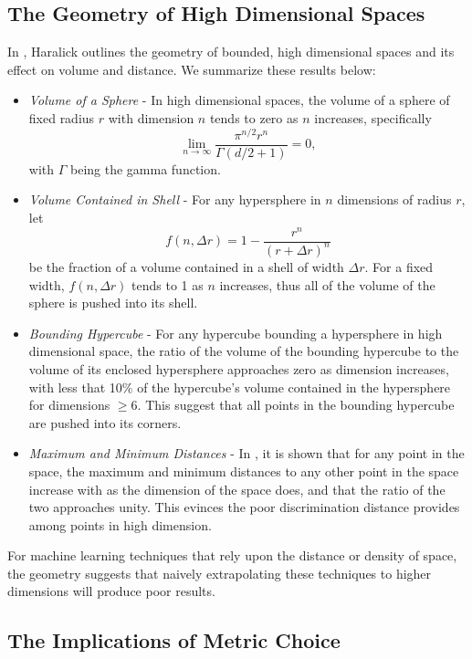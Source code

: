 \documentclass{article}
\begin{document}
\subsection{The Geometry of High Dimensional Spaces}
In \cite{haralickgeometryhd}, Haralick outlines the geometry of bounded, high dimensional spaces and its effect on volume and distance. We summarize these results below:
\begin{itemize} 
\item\emph{Volume of a Sphere} - In high dimensional spaces, the volume of a sphere of fixed radius $r$ with dimension $n$ tends to zero as $n$ increases, specifically
$$
\lim_{n\rightarrow\infty}\dfrac{\pi^{n/2}r^n}{\Gamma(d/2+1)}=0,
$$
with $\Gamma$ being the gamma function.
\item \emph{Volume Contained in Shell} - For any hypersphere in $n$ dimensions of radius $r$, let
$$
f(n,\Delta r)=1 -\dfrac{r^n}{(r+\Delta r)^n}
$$
be the fraction of a volume contained in a shell of width $\Delta r$. For a fixed width, $f(n,\Delta r)$ tends to 1 as $n$ increases, thus all of the volume of the sphere is pushed into its shell.
\item\emph{Bounding Hypercube} - For any hypercube bounding a hypersphere in high dimensional space, the ratio of the volume of the bounding hypercube to the volume of its enclosed hypersphere approaches zero as dimension increases, with less that 10\% of the hypercube's volume contained in the hypersphere for dimensions $\geq 6$. This suggest that all points in the bounding hypercube are pushed into its corners. 
\item\emph{Maximum and Minimum Distances} - In \cite{haralicknn}, it is shown that for any point in the space, the maximum and minimum distances to any other point in the space increase with as the dimension of the space does, and that the ratio of the two approaches unity.  This evinces the poor discrimination distance provides among points in high dimension.
\end{itemize}
For machine learning techniques that rely upon the distance or density of space, the geometry suggests that naively extrapolating these techniques to higher dimensions will produce poor results.
\subsection{The Implications of Metric Choice}
\end{document}
